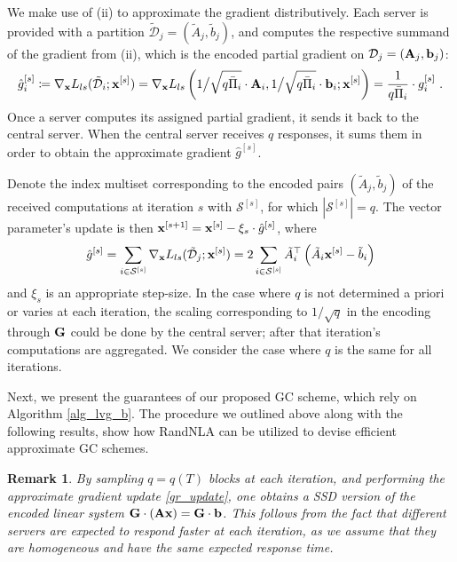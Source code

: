 \documentclass[journal,letterpaper,onecolumn,twoside,nofonttune]{IEEEtran}
\newcommand{\D}{\mathcal{D}}
\newcommand{\Scal}{\mathcal{S}}
\newcommand{\bb}{\bold{b}}
\newcommand{\xb}{\bold{x}}
\newcommand{\Ab}{\bold{A}}
\newcommand{\Gb}{\bold{G}}
\newcommand{\At}{\tilde{A}}
\newcommand{\bt}{\tilde{b}}
\newcommand{\Dt}{\tilde{\mathcal{D}}}
\newcommand{\gh}{\hat{g}}
\newcommand{\Pib}{\bar{\Pi}}
\newtheorem{Rmk}{Remark}
\begin{document}
We make use of (ii) to approximate the gradient distributively. Each server is provided with a partition $\Dt_j=(\At_j,\bt_j)$, and computes the respective summand of the gradient from (ii), which is the encoded partial gradient on $\D_j=(\Ab_j,\bb_j)$:
\begin{equation}
\label{gt_unif_id}  %
  \gh_i^{[s]}\coloneqq\nabla_{\xb}L_{ls}(\Dt_i;\xb^{[s]})=\nabla_{\xb}L_{ls}\left(1\big/\sqrt{q\Pib_i}\cdot\Ab_i,1\big/\sqrt{q\Pib_i}\cdot\bb_i;\xb^{[s]}\right)=\frac{1}{q\Pib_i}\cdot g_i^{[s]}\ .
\end{equation}
Once a server computes its assigned partial gradient, it sends it back to the central server. When the central server receives $q$ responses, it sums them in order to obtain the approximate gradient $\gh^{[s]}$.

Denote the index multiset corresponding to the encoded pairs $(\At_j,\bt_j)$ of the received computations at iteration $s$ with $\Scal^{[s]}$, for which $|\Scal^{[s]}|=q$. The vector parameter's update is then $\xb^{[s+1]}=\xb^{[s]}-\xi_s\cdot\gh^{[s]}$, where
\begin{equation}
\label{gr_update}
  \gh^{[s]} = \sum_{i\in\Scal^{[s]}}\nabla_{\xb}L_{ls}(\Dt_j;\xb^{[s]}) = 2\sum\limits_{i\in\Scal^{[s]}}\At_i^\top\left(\At_i\xb^{[s]}-\bt_i\right)
\end{equation}
and $\xi_s$ is an appropriate step-size. In the case where $q$ is not determined a priori or varies at each iteration, the scaling corresponding to $1/\sqrt{q}$ in the encoding through $\Gb$ could be done by the central server; after that iteration's computations are aggregated. We consider the case where $q$ is the same for all iterations.

Next, we present the guarantees of our proposed GC scheme, which rely on Algorithm \ref{alg_lvg_b}. The procedure we outlined above along with the following results, show how RandNLA can be utilized to devise efficient approximate GC schemes.

\begin{Rmk}
\label{rmk_SSD}
By sampling $q=q(T)$ blocks at each iteration, and performing the approximate gradient update \eqref{gr_update}, one obtains a SSD version of the encoded linear system $\Gb\cdot(\Ab\xb)=\Gb\cdot\bb$. This follows from the fact that different servers are expected to respond faster at each iteration, as we assume that they are homogeneous and have the same expected response time.
\end{Rmk}
\end{document}
